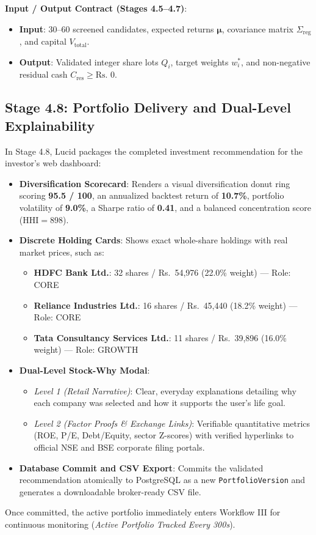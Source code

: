 \noindent \textbf{Input / Output Contract (Stages 4.5--4.7)}:
\begin{itemize}
    \item \textbf{Input}: 30--60 screened candidates, expected returns $\boldsymbol{\mu}$, covariance matrix $\Sigma_{\text{reg}}$, and capital $V_{\text{total}}$.
    \item \textbf{Output}: Validated integer share lots $Q_i$, target weights $w_i^*$, and non-negative residual cash $C_{\text{res}} \ge \text{Rs.~}0$.
\end{itemize}

\subsection{Stage 4.8: Portfolio Delivery and Dual-Level Explainability}
In Stage 4.8, Lucid packages the completed investment recommendation for the investor's web dashboard:
\begin{itemize}
    \item \textbf{Diversification Scorecard}: Renders a visual diversification donut ring scoring \textbf{95.5 / 100}, an annualized backtest return of \textbf{10.7\%}, portfolio volatility of \textbf{9.0\%}, a Sharpe ratio of \textbf{0.41}, and a balanced concentration score ($\text{HHI} = 898$).
    \item \textbf{Discrete Holding Cards}: Shows exact whole-share holdings with real market prices, such as:
    \begin{itemize}
        \item \textbf{HDFC Bank Ltd.}: 32 shares / Rs.~54,976 (22.0\% weight) --- Role: CORE
        \item \textbf{Reliance Industries Ltd.}: 16 shares / Rs.~45,440 (18.2\% weight) --- Role: CORE
        \item \textbf{Tata Consultancy Services Ltd.}: 11 shares / Rs.~39,896 (16.0\% weight) --- Role: GROWTH
    \end{itemize}
    \item \textbf{Dual-Level Stock-Why Modal}:
    \begin{itemize}
        \item \textit{Level 1 (Retail Narrative)}: Clear, everyday explanations detailing why each company was selected and how it supports the user's life goal.
        \item \textit{Level 2 (Factor Proofs \& Exchange Links)}: Verifiable quantitative metrics (ROE, P/E, Debt/Equity, sector Z-scores) with verified hyperlinks to official NSE and BSE corporate filing portals.
    \end{itemize}
    \item \textbf{Database Commit and CSV Export}: Commits the validated recommendation atomically to PostgreSQL as a new \texttt{PortfolioVersion} and generates a downloadable broker-ready CSV file.
\end{itemize}
Once committed, the active portfolio immediately enters Workflow III for continuous monitoring (\textit{Active Portfolio Tracked Every 300s}).

